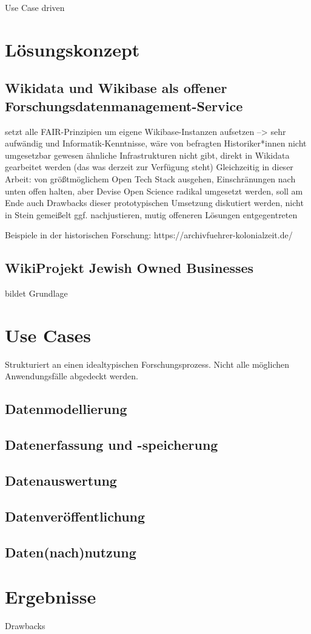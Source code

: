 \onehalfspacing

Use Case driven

\section{Lösungskonzept}
\subsection{Wikidata und Wikibase als offener Forschungsdatenmanagement-Service}
setzt alle FAIR-Prinzipien um
eigene Wikibase-Instanzen aufsetzen --> sehr aufwändig und Informatik-Kenntnisse, wäre von befragten Historiker*innen nicht umgesetzbar gewesen
ähnliche Infrastrukturen nicht gibt, direkt in Wikidata gearbeitet werden (das was derzeit zur Verfügung steht)
Gleichzeitig in dieser Arbeit: von größtmöglichem Open Tech Stack ausgehen, Einschränungen nach unten offen halten, aber Devise Open Science radikal umgesetzt werden, soll am Ende auch Drawbacks dieser prototypischen Umsetzung diskutiert werden, nicht in Stein gemeißelt ggf. nachjustieren, mutig offeneren Lösungen entgegentreten

Beispiele in der historischen Forschung:
https://archivfuehrer-kolonialzeit.de/


\subsection{WikiProjekt Jewish Owned Businesses}
bildet Grundlage

\section{Use Cases}

Strukturiert an einen idealtypischen Forschungsprozess. Nicht alle möglichen Anwendungsfälle abgedeckt werden.

\subsection{Datenmodellierung}

\subsection{Datenerfassung und -speicherung}

\subsection{Datenauswertung}

\subsection{Datenveröffentlichung}

\subsection{Daten(nach)nutzung}

\section{Ergebnisse}

Drawbacks